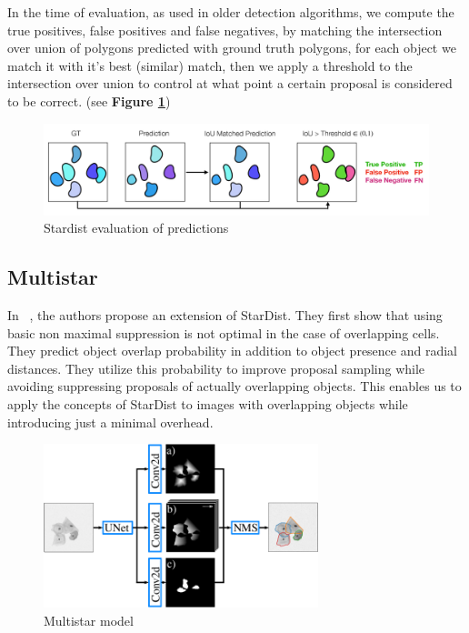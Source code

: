 \documentclass[main.tex]{subfiles}
\begin{document}
In the time of evaluation, as used in older detection algorithms, we compute the true positives, false positives and false negatives, by matching the intersection over union of polygons predicted with ground truth polygons, for each object we match it with it's best (similar) match, then we apply a threshold to the intersection over union to control at what point a certain proposal is considered to be correct. (see \textbf{Figure \ref{fig:stardistOutput}})

\begin{figure}[H]
    \centering
    \includegraphics[width=16cm]{images/stardistEval.PNG}
    \caption{Stardist evaluation of predictions}
    \label{fig:stardistOutput}
\end{figure}

\subsection{Multistar}
In ~\cite{Walter2020}, the authors propose an extension of StarDist. They first show that using basic non maximal suppression is not optimal in the case of overlapping cells. They predict object overlap probability in addition to object presence and radial distances. They utilize this probability to improve proposal sampling while avoiding suppressing proposals of actually overlapping objects. This enables us to apply the concepts of StarDist to images with overlapping objects while introducing just a minimal overhead. 

\begin{figure}[H]
    \centering
    \includegraphics[width=8cm]{images/multistar.png}
    \caption{Multistar model}
    \label{fig:ac}
\end{figure}
\end{document}
